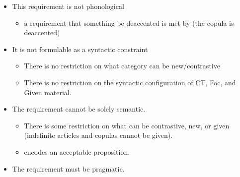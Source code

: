\documentclass[GPFinal]{subfiles}
\begin{document}
\begin{itemize}
  \item This requirement is not phonological
    \begin{itemize}
      \item a requirement that something be deaccented is met by \Last (the copula is deaccented)
    \end{itemize}
  \item It is not formulable as a syntactic constraint
    \begin{itemize}
      \item There is no restriction on what category can be new/contrastive
      \item There is no restriction on the syntactic configuration of CT, Foc, and Given material.
    \end{itemize}
  \item The requirement cannot be solely semantic.
    \begin{itemize}
      \item There is some restriction on what can be contrastive, new, or given (indefinite articles and copulas cannot be given).
      \item \Last encodes an acceptable proposition.
    \end{itemize}
  \item The requirement must be pragmatic.
\end{itemize}
\printbibliography
\end{document}
